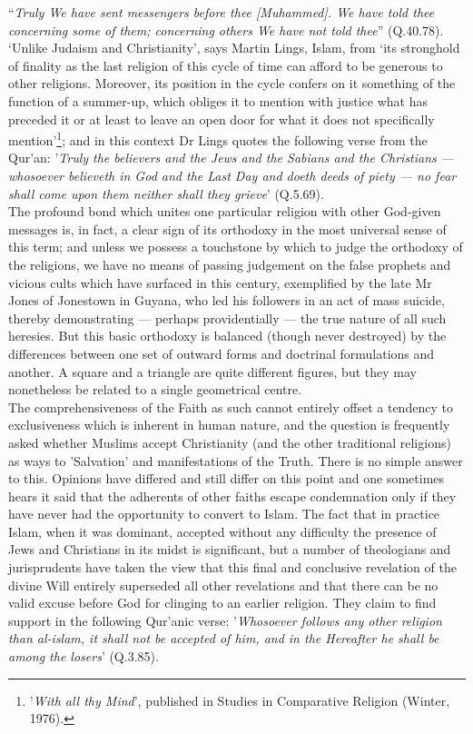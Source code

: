 \documentclass[10pt, twoside,openright]{book}
\begin{document}
``\emph{Truly We have sent messengers before thee [Muhammed]. We have told thee concerning some of them; concerning others We have not told thee}'' (Q.40.78). `Unlike Judaism and Christianity', says Martin Lings, Islam, from `its stronghold of finality as the last religion of this cycle of time can afford 
to be generous to other religions. Moreover, its position in the cycle confers on it something of the 
function of a summer\hyp{}up, which obliges it to mention with justice what has preceded it or at least to 
leave an open door for what it does not specifically mention'\footnote{'\emph{With all thy Mind}', published in Studies in Comparative Religion (Winter, 1976).}; and in this context Dr Lings quotes 
the following verse from the Qur'an: '\emph{Truly the believers and the Jews and the Sabians and the 
Christians --- whosoever believeth in God and the Last Day and doeth deeds of piety --- no fear shall 
come upon them neither shall they grieve}' (Q.5.69). \\



The profound bond which unites one particular religion with other God\hyp{}given messages is, in fact, a 
clear sign of its orthodoxy in the most universal sense of this term; and unless we possess a 
touchstone by which to judge the orthodoxy of the religions, we have no means of passing judgement on 
the false prophets and vicious cults which have surfaced in this century, exemplified by the late Mr 
Jones of Jonestown in Guyana, who led his followers in an act of mass suicide, thereby demonstrating 
--- perhaps providentially --- the true nature of all such heresies. But this basic orthodoxy is balanced 
(though never destroyed) by the differences between one set of outward forms and doctrinal 
formulations and another. A square and a triangle are quite different figures, but they may 
nonetheless be related to a single geometrical centre. \\

The comprehensiveness of the Faith as such cannot entirely offset a tendency to exclusiveness which 
is inherent in human nature, and the question is frequently asked whether Muslims accept Christianity 
(and the other traditional religions) as ways to 'Salvation' and manifestations of the Truth. There 
is no simple answer to this. Opinions have differed and still differ on this point and one sometimes 
hears it said that the adherents of other faiths escape condemnation only if they have never had the 
opportunity to convert to Islam. The fact that in practice Islam, when it was dominant, accepted 
without any difficulty the presence of Jews and Christians in its midst is significant, but a number 
of theologians and jurisprudents have taken the view that this final and conclusive revelation of the 
divine Will entirely superseded all other revelations and that there can be no valid excuse before 
God for clinging to an earlier religion. They claim to find support in the following Qur'anic verse: 
'\emph{Whosoever follows any other religion than al\hyp{}islam, it shall not be accepted of him, and in the 
Hereafter he shall be among the losers}' (Q.3.85). \\
\end{document}
